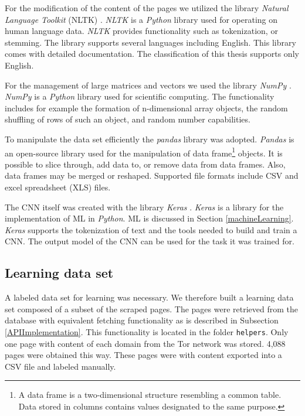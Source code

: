 For the modification of the content of the pages we utilized the library \textit{Natural Language Toolkit} (NLTK) \cite{nltk}. \textit{NLTK} is a \textit{Python} library used for operating on human language data. \textit{NLTK} provides functionality such as tokenization, or stemming. The library supports several languages including English. This library comes with detailed documentation. The classification of this thesis supports only English.

For the management of large matrices and vectors we used the library \textit{NumPy} \cite{numpy}. \textit{NumPy} is a \textit{Python} library used for scientific computing. The functionality includes for example the formation of n-dimensional array objects, the random shuffling of rows of such an object, and random number capabilities. 

To manipulate the data set efficiently the \textit{pandas} library \cite{pandas} was adopted. \textit{Pandas} is an open-source library used for the manipulation of data frame\footnote{A data frame is a two-dimensional structure resembling a common table. Data stored in columns contains values designated to the same purpose. } objects. It is possible to slice through, add data to, or remove data from data frames. Also, data frames may be merged or reshaped. Supported file formats include CSV and excel spreadsheet (XLS) files.

The CNN itself was created with the library \textit{Keras} \cite{keras}. \textit{Keras} is a library for the implementation of ML in \textit{Python}. ML is discussed in Section \ref{machineLearning}. \textit{Keras} supports the tokenization of text and the tools needed to build and train a CNN. The output model of the CNN can be used for the task it was trained for.

\subsection{Learning data set} \label{LearningDatasetImplementation}
A labeled data set for learning was necessary. We therefore built a learning data set composed of a subset of the scraped pages. The pages were retrieved from the database with equivalent fetching functionality as is described in Subsection \ref{APIImplementation}. This functionality is located in the folder \texttt{helpers}. Only one page with content of each domain from the Tor network was stored. 4,088 pages were obtained this way. These pages were with content exported into a CSV file and labeled manually. 

